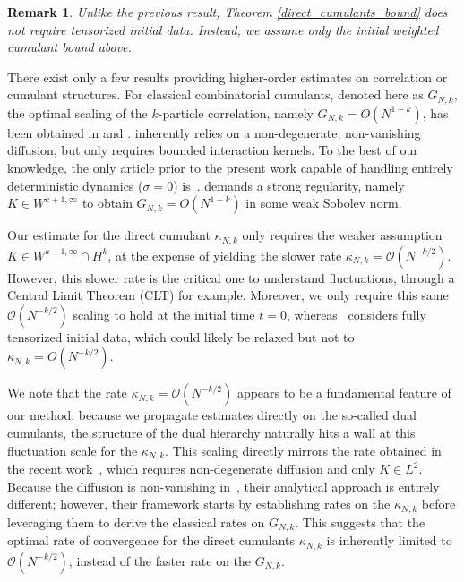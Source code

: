 \documentclass[pdflatex,sn-mathphys-num]{sn-jnl}
\theoremstyle{thmstyleone}%
\theoremstyle{thmstyletwo}%
\newtheorem{remark}{Remark}%
\theoremstyle{thmstylethree}%
\begin{document}
\begin{remark}
Unlike the previous result, Theorem \ref{direct_cumulants_bound} does not require tensorized initial data. Instead, we assume only the initial weighted cumulant bound above.
\end{remark}

There exist only a few results providing higher-order estimates on correlation or cumulant structures. For classical combinatorial cumulants, denoted here as $G_{N,k}$, the optimal scaling of the \(k\)-particle correlation, namely \(G_{N,k}=O(N^{1-k})\), has been obtained in \cite{duerinckx2021size} and \cite{hess2025higher}. \cite{hess2025higher} inherently relies on a non-degenerate, non-vanishing diffusion, but only requires bounded interaction kernels.  
To the best of our knowledge, the only article prior to the present work capable of handling entirely deterministic dynamics ($\sigma=0$) is~\cite{duerinckx2021size}. \cite{duerinckx2021size} demands a strong regularity, namely $K\in W^{k+1,\infty}$ to obtain \(G_{N,k}=O(N^{1-k})\) in some weak Sobolev norm. 

Our estimate for the direct cumulant $\kappa_{N,k}$ only requires the weaker assumption \(K\in W^{k-1,\infty}\cap H^k\), at the expense of yielding the slower rate \(\kappa_{N,k} = \mathcal{O}(N^{-k/2})\). 
However, this slower rate is the critical one to understand fluctuations, through a Central Limit Theorem (CLT) for example. 
Moreover, we only require this same $\mathcal{O}(N^{-k/2})$ scaling to hold at the initial time $t=0$, whereas~\cite{duerinckx2021size} considers fully tensorized initial data, which could likely be relaxed but not to \( \kappa_{N,k} = O(N^{-k/2})\).

We note that the rate $\kappa_{N,k} = \mathcal{O}(N^{-k/2})$ appears to be a fundamental feature of our method, because we propagate estimates directly on the so-called dual cumulants, the structure of the dual hierarchy naturally hits a wall at this fluctuation scale for the $\kappa_{N,k}$.
This scaling directly mirrors the rate obtained in the recent work~\cite{duerinckx2025correlation}, which requires non-degenerate diffusion and only $K\in L^2$. 
Because the diffusion is non-vanishing in~\cite{duerinckx2025correlation}, their analytical approach is entirely different; however, their framework starts by establishing rates on the $\kappa_{N,k}$ before leveraging them to derive the classical rates on $G_{N,k}$. 
This suggests that the optimal rate of convergence for the direct cumulants $\kappa_{N,k}$ is inherently limited to $\mathcal{O}(N^{-k/2})$, instead of the faster rate on the $G_{N,k}$.
\end{document}
